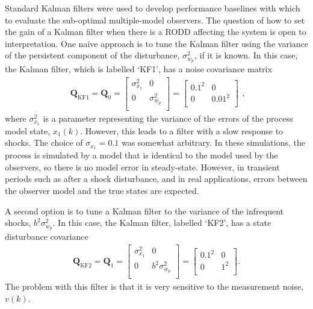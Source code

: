Standard Kalman filters were used to develop performance baselines with which to evaluate the sub-optimal multiple-model observers. The question of how to set the gain of a Kalman filter when there is a \gls{RODD} affecting the system is open to interpretation. One naive approach is to tune the Kalman filter using the variance of the persistent component of the disturbance, $\sigma_{w_p}^2$, if it is known. In this case, the Kalman filter, which is labelled `KF1', has a noise covariance matrix
\begin{equation} \label{eq:sim-sys-siso-KF1-Q}
	\begin{aligned}
		\mathbf{Q}_{\text{KF1}}=\mathbf{Q}_0=\begin{bmatrix}
			\sigma_{x_1}^2 & 0 \\
			0 &  \sigma_{w_p}^2 \\
		\end{bmatrix}=\begin{bmatrix}
		0.1^2 & 0 \\
		0 & 0.01^2 \\
	\end{bmatrix}
	\end{aligned},
\end{equation}
where $\sigma_{x_1}^2$ is a parameter representing the variance of the errors of the process model state, $x_1(k)$. However, this leads to a filter with a slow response to shocks. The choice of $\sigma_{x_1}=0.1$ was somewhat arbitrary. In these simulations, the process is simulated by a model that is identical to the model used by the observers, so there is no model error in steady-state. However, in transient periods such as after a shock disturbance, and in real applications, errors between the observer model and the true states are expected.

A second option is to tune a Kalman filter to the variance of the infrequent shocks, $b^2\sigma_{w_p}^2$.  In this case, the Kalman filter, labelled `KF2', has a state disturbance covariance
\begin{equation} \label{eq:sim-sys-siso-KF2-Q}
	\begin{aligned}
		\mathbf{Q}_{\text{KF2}}=\mathbf{Q}_1=\begin{bmatrix}
			\sigma_{x_1}^2 & 0 \\
			0 & b^2\sigma_{w_p}^2 \\
		\end{bmatrix}=\begin{bmatrix}
			0.1^2 & 0 \\
			0 & 1^2 \\
		\end{bmatrix}.
	\end{aligned}
\end{equation}
The problem with this filter is that it is very sensitive to the measurement noise, $v(k)$. 

